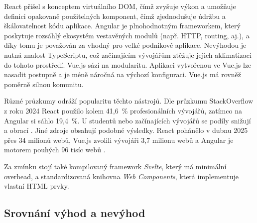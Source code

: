 React přišel s konceptem virtuálního DOM, čímž zvyšuje výkon a umožňuje
definici opakovaně použitelných komponent, čímž zjednodušuje údržbu
a škálovatelnost kódu aplikace. Angular je plnohodnotným frameworkem, který
poskytuje rozsáhlý ekosystém vestavěných modulů (např. HTTP, routing, aj.),
a díky tomu je považován za vhodný pro velké podnikové aplikace. Nevýhodou
je nutná znalost TypeScriptu, což začínajícím vývojářům ztěžuje jejich
aklimatizaci do tohoto prostředí. Vue.js sází na modularitu. Aplikaci
vytvořenou ve Vue.js lze nasadit postupně a je méně náročná na výchozí
konfiguraci. Vue.js má rovněž poměrně silnou komunitu.
\cite{YHVfLHsNlUItkF6G,1WL9hIh67tHjtVTy} %

Různé průzkumy odráží popularitu těchto nástrojů. Dle průzkumu StackOverflow
z roku 2024 React použilo kolem 41,6~\% profesionálních vývojářů, zatímco
na Angular si sáhlo 19,4~\%. U studentů nebo začínajících vývojářů se podíly
snižují a obrací \cite{YHVfLHsNlUItkF6G,w6F4OYb0neliWLGP}. %
Jiné zdroje obsahují podobné výsledky. React pohánělo v dubnu 2025
přes 34 milionů webů, Vue.js zvolili vývojáři 3,7 milionu webů a Angular
je motorem pouhých 96 tisíc webů \cite{YHVfLHsNlUItkF6G,1WL9hIh67tHjtVTy}.

Za zmínku stojí také kompilovaný framework \emph{Svelte}, který
má minimální overhead, a standardizovaná knihovna \emph{Web Components},
která implementuje vlastní HTML prvky.

\subsection{Srovnání výhod a nevýhod}
\label{sec:frontend-advatages-disadvantages}

